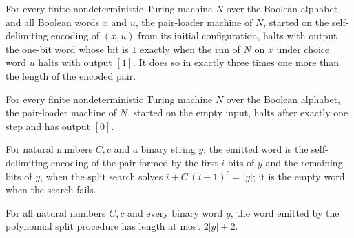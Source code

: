 \begin{lemma}
\label{Complexity.cont_pair_computes}
\leanok
{}
For every finite nondeterministic Turing machine $N$ over the Boolean alphabet and all
Boolean words $x$ and $u$, the pair-loader machine of $N$, started on the
self-delimiting encoding of $(x,u)$ from its initial configuration, halts with output
the one-bit word whose bit is $1$ exactly when the run of $N$ on $x$ under choice word
$u$ halts with output $[1]$. It does so in exactly three times one more than the length
of the encoded pair.
\end{lemma}

\begin{lemma}
\label{Complexity.cont_pair_empty}
\leanok
{}
For every finite nondeterministic Turing machine $N$ over the Boolean alphabet, the
pair-loader machine of $N$, started on the empty input, halts after exactly one step and
has output $[0]$.
\end{lemma}

\begin{definition}
\label{Complexity.contSplitWord}
\leanok
{}
For natural numbers $C, c$ and a binary string $y$, the emitted word is the self-delimiting encoding of the pair formed by the first $i$ bits of $y$ and the remaining bits of $y$, when the split search solves $i + C\,(i+1)^c = |y|$; it is the empty word when the search fails.
\end{definition}

\begin{lemma}
\label{Complexity.cont_split_length}
\leanok
{}
For all natural numbers $C,c$ and every binary word $y$, the word emitted by the
polynomial split procedure has length at most $2|y|+2$.
\end{lemma}

